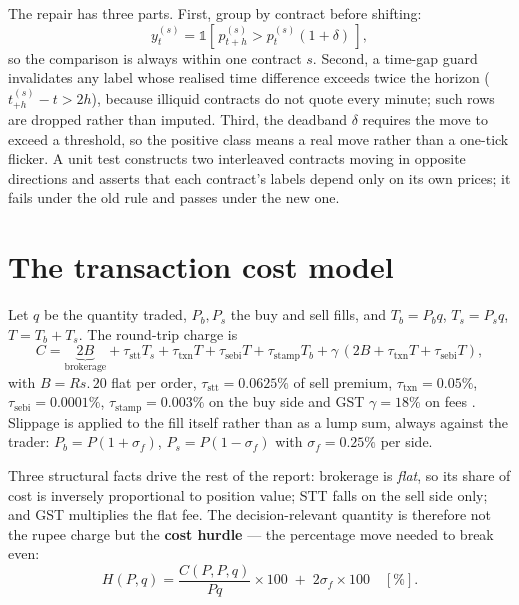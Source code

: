 \documentclass[10pt,a4paper]{article}
\newcommand{\rs}{Rs.\,}
\begin{document}
The repair has three parts. First, group by contract before shifting:
\begin{equation}
y^{(s)}_t = \mathbb{1}\!\left[\, p^{(s)}_{t+h} > p^{(s)}_{t}(1+\delta) \,\right],
\end{equation}
so the comparison is always within one contract $s$. Second, a time-gap guard
invalidates any label whose realised time difference exceeds twice the horizon
($t^{(s)}_{+h} - t > 2h$), because illiquid contracts do not quote every
minute; such rows are dropped rather than imputed. Third, the deadband
$\delta$ requires the move to exceed a threshold, so the positive class means a
real move rather than a one-tick flicker. A unit test constructs two
interleaved contracts moving in opposite directions and asserts that each
contract's labels depend only on its own prices; it fails under the old rule
and passes under the new one.

\section{The transaction cost model}\label{sec:costs}

Let $q$ be the quantity traded, $P_b,P_s$ the buy and sell fills, and
$T_b=P_bq$, $T_s=P_sq$, $T=T_b+T_s$. The round-trip charge is
\begin{equation}
C = \underbrace{2B}_{\text{brokerage}} + \tau_{\text{stt}}T_s
  + \tau_{\text{txn}}T + \tau_{\text{sebi}}T + \tau_{\text{stamp}}T_b
  + \gamma\,(2B + \tau_{\text{txn}}T + \tau_{\text{sebi}}T),
\label{eq:cost}
\end{equation}
with $B=\rs 20$ flat per order, $\tau_{\text{stt}}=0.0625\%$ of sell premium,
$\tau_{\text{txn}}=0.05\%$, $\tau_{\text{sebi}}=0.0001\%$,
$\tau_{\text{stamp}}=0.003\%$ on the buy side and GST $\gamma=18\%$ on fees
\cite{zerodhacharges}. Slippage is applied to the fill itself rather than as a
lump sum, always against the trader: $P_b=P(1+\sigma_{\!f})$,
$P_s=P(1-\sigma_{\!f})$ with $\sigma_{\!f}=0.25\%$ per side.

Three structural facts drive the rest of the report: brokerage is \emph{flat},
so its share of cost is inversely proportional to position value; STT falls on
the sell side only; and GST multiplies the flat fee. The decision-relevant
quantity is therefore not the rupee charge but the \textbf{cost hurdle} --- the
percentage move needed to break even:
\begin{equation}
H(P,q) = \frac{C(P,P,q)}{Pq}\times 100 \;+\; 2\sigma_{\!f}\times 100 \quad [\%].
\label{eq:hurdle}
\end{equation}
\end{document}
